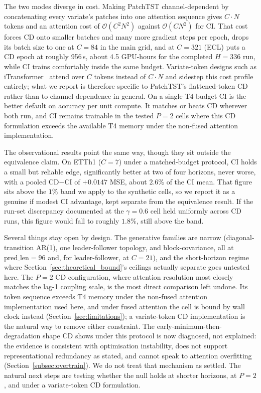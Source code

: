 \documentclass[10pt]{article} %
\begin{document}
    The two modes diverge in cost. Making PatchTST channel-dependent by concatenating every variate's
    patches into one attention sequence gives $C \cdot N$ tokens and an attention cost of $\mathcal{O}(C^2 N^2)$ against
    $\mathcal{O}(C N^2)$ for CI. That cost forces CD onto smaller batches and many more gradient steps per epoch, drops
    its batch size to one at $C = 84$ in the main grid, and at $C = 321$ (ECL) puts a CD epoch at roughly 956\,s, about
    4.5 GPU-hours for the completed $H = 336$ run, while CI trains comfortably inside the same budget. Variate-token
    designs such as iTransformer~\citep{liu2024itransformer} attend over $C$ tokens instead of $C \cdot N$ and sidestep
    this cost profile entirely; what we report is therefore specific to PatchTST's flattened-token CD rather than to channel
    dependence in general. On a single-T4 budget CI is the better default on accuracy per unit compute. It matches or
    beats CD wherever both run, and CI remains trainable in the tested $P = 2$ cells where this CD formulation exceeds the
    available T4 memory under the non-fused attention implementation.

    The observational results point the same way, though they sit outside the equivalence claim. On ETTh1 ($C = 7$)
    under a matched-budget protocol, CI holds a small but reliable edge, significantly better at two of four horizons,
    never worse, with a pooled CD$-$CI of $+0.0147$ MSE, about $2.6\%$ of the CI mean. That figure sits above the $1\%$
    band we apply to the synthetic cells, so we report it as a genuine if modest CI advantage, kept separate
    from the equivalence result. If the run-set discrepancy documented at the $\gamma = 0.6$ cell held uniformly across
    CD runs, this figure would fall to roughly $1.8\%$, still above the band.

    Several things stay open by design. The generative families are narrow (diagonal-transition AR(1), one
    leader-follower topology, and block-covariance, all at $\text{pred\_len} = 96$ and, for leader-follower, at
    $C = 21$), and the short-horizon regime where Section~\ref{sec:theoretical_bound}'s ceilings actually separate
    goes untested here. The $P = 2$ CD configuration, where attention resolution most closely matches the lag-1
    coupling scale, is the most direct comparison left undone. Its token sequence exceeds T4 memory under the non-fused attention implementation used here, and under fused
    attention the cell is bound by wall clock instead (Section~\ref{sec:limitations}); a variate-token CD implementation
    is the natural way to remove either constraint. The early-minimum-then-degradation shape
    CD shows under this protocol is now diagnosed, not explained: the evidence is consistent with optimisation
    instability, does not support representational redundancy as stated, and cannot speak to attention overfitting
    (Section~\ref{subsec:overtrain}). We do not treat that mechanism as settled. The natural next steps are testing
    whether the null holds at shorter horizons, at $P = 2$, and under a variate-token CD formulation.

    
    
\end{document}
